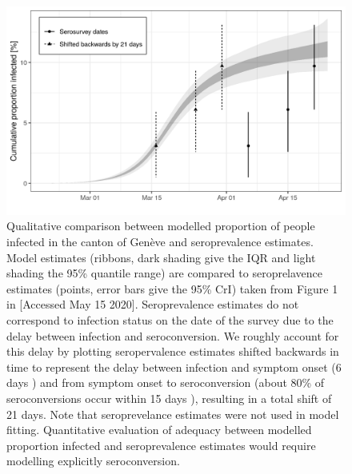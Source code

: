 \begin{figure}
    \centering
    \includegraphics[width=.8\textwidth]{fig_covid-switzerland-npi/fig_supp/GE_seroprevalence_comparison.png}
    \caption[Qualitative comparison between modelled infected in the canton of Genève and seroprevalence estimates]{Qualitative comparison between modelled proportion of people infected in the canton of Genève and seroprevalence estimates. Model estimates (ribbons, dark shading give the IQR and light shading the 95\% quantile range) are compared to seroprelavence estimates (points, error bars give the 95\% CrI)   taken from Figure 1 in \parencite{stringhini_repeated_2020} [Accessed May 15 2020]. Seroprevalence estimates do not correspond to infection status on the date of the survey due to the delay between infection and seroconversion. We roughly account for this delay by plotting seropervalence estimates shifted backwards in time to represent the delay between infection and symptom onset (6 days \parencite{bi_epidemiology_2020}) and from symptom onset to seroconversion (about 80\% of seroconversions occur within 15 days \parencite{huang_systematic_2020}), resulting in a total shift of 21 days. Note that seroprevelance estimates were not used in model fitting. Quantitative evaluation of adequacy between modelled proportion infected and seroprevalence estimates would require modelling explicitly seroconversion.}
    \label{fig:seroprev}
\end{figure}

